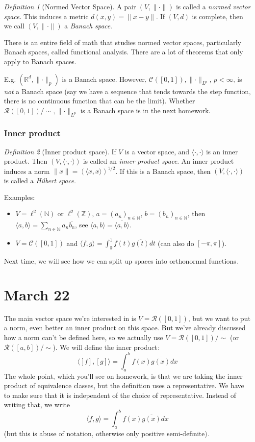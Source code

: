 \documentclass{article}
\theoremstyle{plain}
\theoremstyle{remark}
\newtheorem{definition}{Definition}
\newcommand{\N}{{\mathbb N}}
\newcommand{\Z}{{\mathbb Z}}
\newcommand{\R}{{\mathbb R}}
\begin{document}
\begin{definition}[Normed Vector Space]
	A pair $(V,\lVert \cdot \rVert)$ is called a \emph{normed vector space}.
	This induces a metric $d(x,y) = \lVert x - y \rVert$.
	If $(V,d)$ is complete, then we call $(V,\lVert \cdot \rVert)$ a \emph{Banach space}.
\end{definition}
There is an entire field of math that studies normed vector spaces,
particularly Banach spaces, called functional analysis.
There are a lot of theorems that only apply to Banach spaces.

E.g. $(\R^d,\lVert \cdot \rVert_p)$ is a Banach space.
However, $\mathcal{C}([0,1]), \lVert \cdot \rVert_{L^p}$, $p < \infty$,
is \emph{not} a Banach space
(say we have a sequence that tends towards the step function,
there is no continuous function that can be the limit).
Whether $\mathcal{R}([0,1])/\sim, \lVert \cdot \rVert_{L^p}$ is a Banach space
is in the next homework.

\subsubsection{Inner product}
\begin{definition}[Inner product space]
	If $V$ is a vector space, and $\langle \cdot, \cdot \rangle$ is an inner product.
	Then $(V,\langle \cdot, \cdot \rangle)$ is called an \emph{inner product space}.
	An inner product induces a norm $\lVert x \rVert = \left( \langle x,x \rangle\right)^{1/2}$.
	If this is a Banach space, then $(V,\langle \cdot, \cdot \rangle)$ is
	called a \emph{Hilbert space}.
\end{definition}
Examples:
\begin{itemize}
	\item $V = \ell^2(\N)$ or $\ell^2(\Z)$, $a = (a_n)_{n \in \N}$,
		$b = (b_n)_{n \in \N}$,
		then $\langle a ,b \rangle = \sum_{n \in \N} a_n \overline{b_n}$,
		see $\langle a,b \rangle = \overline{\langle a, b \rangle}$.
	\item $V = \mathcal{C}([0,1])$ and $\langle f,g \rangle =
		\int_0^1 f(t)\overline{g(t)}dt$
		(can also do $[-\pi,\pi]$).
\end{itemize}
Next time, we will see how we can split up spaces into orthonormal functions.


\section{March 22}
The main vector space we're interested in is $V = \mathcal{R}([0,1])$,
but we want to put a norm, even better an inner product on this space.
But we've already discussed how a norm can't be defined here, so we actually use
$V = \mathcal{R}([0,1])/\sim$ (or $\mathcal{R}([a,b])/\sim$).
We will define the inner product:
\[
	\langle [f],[g] \rangle = \int_a^b f(x) \overline{g(x)}dx
\]
The whole point, which you'll see on homework,
is that we are taking the inner product of equivalence classes,
but the definition uses a representative.
We have to make sure that it is independent of the choice of representative.
Instead of writing that, we write
\[
	\langle f ,g \rangle = \int_a^b f(x) \overline{g(x)}dx
\]
(but this is abuse of notation, otherwise only positive semi-definite).
\end{document}
